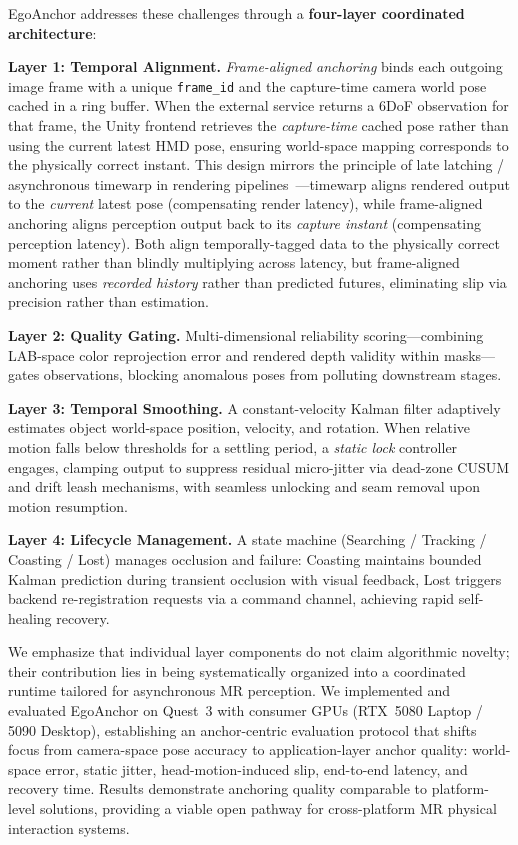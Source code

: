 \documentclass[review]{vgtc}
\begin{document}
EgoAnchor addresses these challenges through a \textbf{four-layer coordinated architecture}:

\noindent\textbf{Layer 1: Temporal Alignment.} \emph{Frame-aligned anchoring} binds each outgoing image frame with a unique \texttt{frame\_id} and the capture-time camera world pose cached in a ring buffer. When the external service returns a 6DoF observation for that frame, the Unity frontend retrieves the \emph{capture-time} cached pose rather than using the current latest HMD pose, ensuring world-space mapping corresponds to the physically correct instant. This design mirrors the principle of late latching / asynchronous timewarp in rendering pipelines~\cite{vanwaveren2016atw,mark1997postrendering}---timewarp aligns rendered output to the \emph{current} latest pose (compensating render latency), while frame-aligned anchoring aligns perception output back to its \emph{capture instant} (compensating perception latency). Both align temporally-tagged data to the physically correct moment rather than blindly multiplying across latency, but frame-aligned anchoring uses \emph{recorded history} rather than predicted futures, eliminating slip via precision rather than estimation.

\noindent\textbf{Layer 2: Quality Gating.} Multi-dimensional reliability scoring---combining LAB-space color reprojection error and rendered depth validity within masks---gates observations, blocking anomalous poses from polluting downstream stages.

\noindent\textbf{Layer 3: Temporal Smoothing.} A constant-velocity Kalman filter adaptively estimates object world-space position, velocity, and rotation. When relative motion falls below thresholds for a settling period, a \emph{static lock} controller engages, clamping output to suppress residual micro-jitter via dead-zone CUSUM and drift leash mechanisms, with seamless unlocking and seam removal upon motion resumption.

\noindent\textbf{Layer 4: Lifecycle Management.} A state machine (Searching / Tracking / Coasting / Lost) manages occlusion and failure: Coasting maintains bounded Kalman prediction during transient occlusion with visual feedback, Lost triggers backend re-registration requests via a command channel, achieving rapid self-healing recovery.

We emphasize that individual layer components do not claim algorithmic novelty; their contribution lies in being systematically organized into a coordinated runtime tailored for asynchronous MR perception. We implemented and evaluated EgoAnchor on Quest~3 with consumer GPUs (RTX~5080 Laptop / 5090 Desktop), establishing an anchor-centric evaluation protocol that shifts focus from camera-space pose accuracy to application-layer anchor quality: world-space error, static jitter, head-motion-induced slip, end-to-end latency, and recovery time. Results demonstrate anchoring quality comparable to platform-level solutions, providing a viable open pathway for cross-platform MR physical interaction systems.
\end{document}
